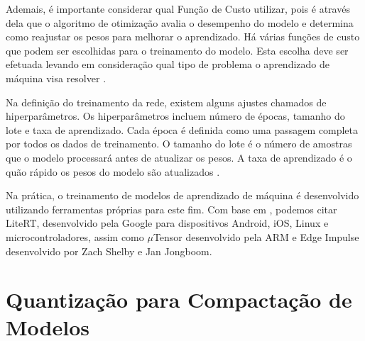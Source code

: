 \documentclass[repeatfields,xlists,xpacks,oneside]{ufrgscca}
\begin{document}
Ademais, é importante considerar qual Função de Custo utilizar, pois é através dela que o algoritmo de otimização avalia o desempenho do modelo e determina como reajustar os pesos para melhorar o aprendizado.
Há várias funções de custo que podem ser escolhidas para o treinamento do modelo. Esta escolha deve ser efetuada levando em consideração qual tipo de problema o aprendizado de máquina visa resolver \cite{Wang2022}.

\begin{table}[H]
 \begin{center}
  \caption{Principais funções de perda para diferentes categorias de aprendizado de máquina.}\label{loss_functions}
 \end{center}
 {}
\end{table}

Na definição do treinamento da rede, existem alguns ajustes chamados de hiperparâmetros. Os hiperparâmetros incluem número de épocas, tamanho do lote e taxa de aprendizado. Cada época é definida como uma passagem completa por todos os dados de treinamento. O tamanho do lote é o número de amostras que o modelo processará antes de atualizar os pesos. A taxa de aprendizado é o quão rápido os pesos do modelo são atualizados \cite{comparaAlg}.

Na prática, o treinamento de modelos de aprendizado de máquina é desenvolvido utilizando ferramentas próprias para este fim. Com base em \cite{Kallimani2024}, podemos citar LiteRT, desenvolvido pela Google para dispositivos Android, iOS, Linux e microcontroladores, assim como $\mu$Tensor desenvolvido pela ARM e Edge Impulse desenvolvido por Zach Shelby e Jan Jongboom.

\section{Quantização para Compactação de Modelos}
\label{sec:quantizacao_teoria}
\end{document}
